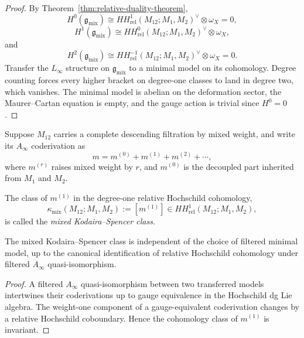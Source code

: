 \begin{proof}
By Theorem~\ref{thm:relative-duality-theorem},
\[
H^0(\mathfrak g_{\mathrm{mix}})
\cong HH^{1}_{\mathrm{rel}}(M_{12};M_1,M_2)^\vee\otimes \omega_X=0,
\]
\[
H^1(\mathfrak g_{\mathrm{mix}})
\cong HH^{0}_{\mathrm{rel}}(M_{12};M_1,M_2)^\vee\otimes \omega_X,
\]
and
\[
H^2(\mathfrak g_{\mathrm{mix}})
\cong HH^{-1}_{\mathrm{rel}}(M_{12};M_1,M_2)^\vee\otimes \omega_X=0.
\]
Transfer the $L_\infty$ structure on $\mathfrak g_{\mathrm{mix}}$ to a minimal model on its cohomology. Degree counting forces every higher bracket on degree-one classes to land in degree two, which vanishes. The minimal model is abelian on the deformation sector, the Maurer--Cartan equation is empty, and the gauge action is trivial since $H^0=0$.
\end{proof}

\begin{definition}
\label{def:mixed-kodaira-spencer-class}
Suppose $M_{12}$ carries a complete descending filtration by mixed weight, and write its $A_\infty$ coderivation as
\[
m = m^{(0)} + m^{(1)} + m^{(2)} + \cdots,
\]
where $m^{(r)}$ raises mixed weight by $r$, and $m^{(0)}$ is the decoupled part inherited from $M_1$ and $M_2$.

The class of $m^{(1)}$ in the degree-one relative Hochschild cohomology,
\[
\kappa_{\mathrm{mix}}(M_{12};M_1,M_2)
:= [m^{(1)}]
\in HH^{1}_{\mathrm{rel}}(M_{12};M_1,M_2),
\]
is called the \emph{mixed Kodaira--Spencer class}.
\end{definition}

\begin{lemma}
\label{lem:mixed-ks-well-defined}
The mixed Kodaira--Spencer class is independent of the choice of filtered minimal model, up to the canonical identification of relative Hochschild cohomology under filtered $A_\infty$ quasi-isomorphism.
\end{lemma}

\begin{proof}
A filtered $A_\infty$ quasi-isomorphism between two transferred models intertwines their coderivations up to gauge equivalence in the Hochschild dg Lie algebra. The weight-one component of a gauge-equivalent coderivation changes by a relative Hochschild coboundary. Hence the cohomology class of $m^{(1)}$ is invariant.
\end{proof}

